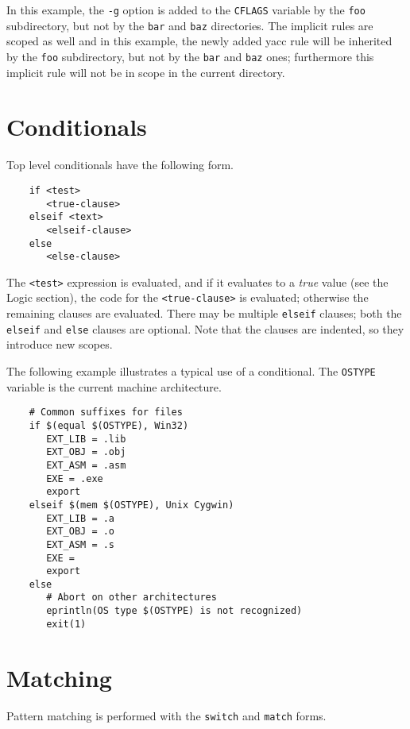 In this example, the \verb+-g+ option is added to the \verb+CFLAGS+
variable by the \verb+foo+ subdirectory, but not by the \verb+bar+ and
\verb+baz+ directories. The implicit rules are scoped as well and in this
example, the newly added yacc rule will be inherited by the \verb+foo+
subdirectory, but not by the \verb+bar+ and \verb+baz+ ones; furthermore
this implicit rule will not be in scope in the current directory.

\section{Conditionals}
\label{section:conditionals}

Top level conditionals have the following form.

\begin{verbatim}
    if <test>
       <true-clause>
    elseif <text>
       <elseif-clause>
    else
       <else-clause>
\end{verbatim}

The \verb+<test>+ expression is evaluated, and if it evaluates to a
\emph{true} value (see the Logic section), the code for the
\verb+<true-clause>+ is evaluated; otherwise the remaining clauses
are evaluated.  There may be multiple \verb+elseif+ clauses;
both the \verb+elseif+ and \verb+else+ clauses are optional.
Note that the clauses are indented, so they introduce new
scopes.

The following example illustrates a typical use of a conditional.  The
\verb+OSTYPE+ variable is the current machine architecture.

\begin{verbatim}
    # Common suffixes for files
    if $(equal $(OSTYPE), Win32)
       EXT_LIB = .lib
       EXT_OBJ = .obj
       EXT_ASM = .asm
       EXE = .exe
       export
    elseif $(mem $(OSTYPE), Unix Cygwin)
       EXT_LIB = .a
       EXT_OBJ = .o
       EXT_ASM = .s
       EXE =
       export
    else
       # Abort on other architectures
       eprintln(OS type $(OSTYPE) is not recognized)
       exit(1)
\end{verbatim}

\section{Matching}
\label{section:match}

Pattern matching is performed with the \verb+switch+ and \verb+match+ forms.

